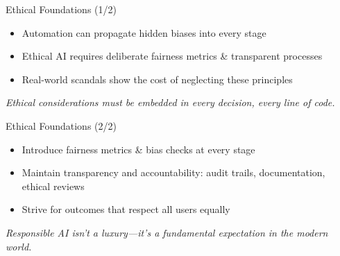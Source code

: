 \documentclass[aspectratio=169]{beamer}
\begin{document}
%
%
%
\begin{frame}{Ethical Foundations (1/2)}
\begin{itemize}
\item Automation can propagate hidden biases into every stage
\item Ethical AI requires deliberate fairness metrics \& transparent processes
\item Real-world scandals show the cost of neglecting these principles
\end{itemize}

\vspace{0.8em}
\emph{Ethical considerations must be embedded in every decision, every line of code.}
\end{frame}

%
%
\begin{frame}{Ethical Foundations (2/2)}
\begin{itemize}
\item Introduce fairness metrics \& bias checks at every stage
\item Maintain transparency and accountability: audit trails, documentation, ethical reviews
\item Strive for outcomes that respect all users equally
\end{itemize}

\vspace{0.8em}
\emph{Responsible AI isn’t a luxury—it’s a fundamental expectation in the modern world.}
\end{frame}
\end{document}
